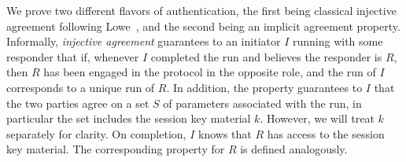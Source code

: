 {%
\label{sec:authenticationDef}
We prove two different flavors of authentication, the first being classical
injective agreement following Lowe~\cite{DBLP:conf/csfw/Lowe97a}, and the second
being an implicit agreement property.
%
Informally, \emph{injective agreement} guarantees to an initiator $I$
running with some responder that if, whenever $I$ completed the run and
believes the responder is $R$,
then $R$ has been engaged in the protocol in the opposite role,
and the run of $I$ corresponds to a unique run of $R$.
%
In addition, the property guarantees to $I$ that the two parties agree on a set
$S$ of parameters associated with the run, in particular the set includes the
session key material $k$.
%
However, we will treat $k$ separately for clarity.
%
On completion, $I$ knows that $R$ has access to the session key material.
%
The corresponding property for $R$ is defined analogously.
%

}
